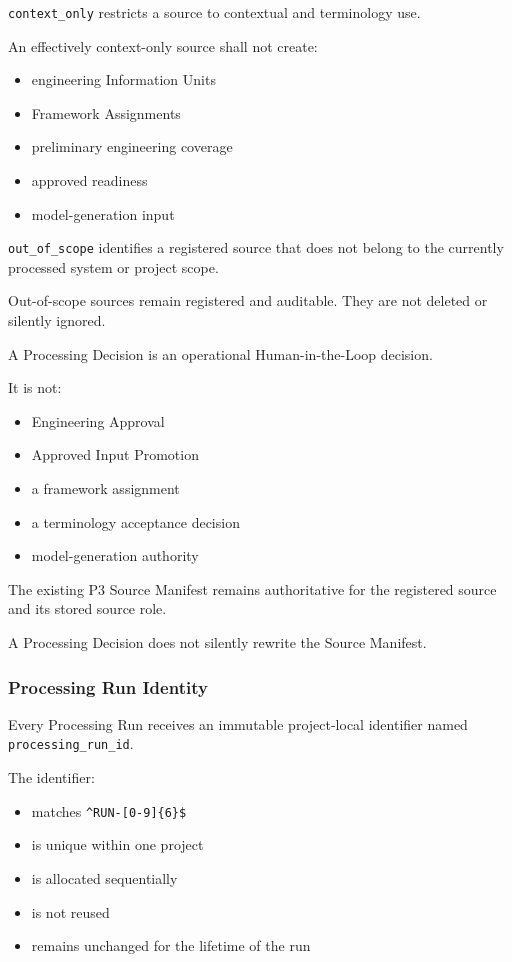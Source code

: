\texttt{context\_only} restricts a source to contextual and terminology use.

An effectively context-only source shall not create:

\begin{itemize}
\tightlist
\item
  engineering Information Units
\item
  Framework Assignments
\item
  preliminary engineering coverage
\item
  approved readiness
\item
  model-generation input
\end{itemize}

\texttt{out\_of\_scope} identifies a registered source that does not belong to the currently processed system or project scope.

Out-of-scope sources remain registered and auditable. They are not deleted or silently ignored.

A Processing Decision is an operational Human-in-the-Loop decision.

It is not:

\begin{itemize}
\tightlist
\item
  Engineering Approval
\item
  Approved Input Promotion
\item
  a framework assignment
\item
  a terminology acceptance decision
\item
  model-generation authority
\end{itemize}

The existing P3 Source Manifest remains authoritative for the registered source and its stored source role.

A Processing Decision does not silently rewrite the Source Manifest.

\hypertarget{processing-run-identity}{%
\subsubsection{Processing Run Identity}\label{processing-run-identity}}

Every Processing Run receives an immutable project-local identifier named \texttt{processing\_run\_id}.

The identifier:

\begin{itemize}
\tightlist
\item
  matches \texttt{\^{}RUN-{[}0-9{]}\{6\}\$}
\item
  is unique within one project
\item
  is allocated sequentially
\item
  is not reused
\item
  remains unchanged for the lifetime of the run
\end{itemize}

